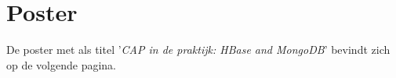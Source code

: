 \chapter{Poster}\label{sec:poster}
De poster met als titel '\textit{CAP in de praktijk: HBase and MongoDB}' bevindt zich op de volgende pagina. 
